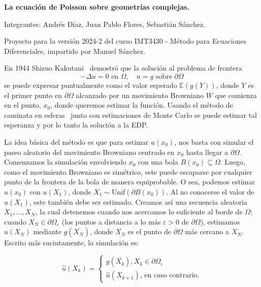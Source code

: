 \documentclass{article}
\begin{document}
\begin{center}
{\bfseries\Large
  La ecuación de Poisson sobre geometrías complejas.
}

\vspace{0.25cm}

Integrantes: Andrés Díaz, Juan Pablo Flores, Sebastián Sánchez.

\vspace{0.5cm}

{\scriptsize
Proyecto para la versión 2024-2 del curso 
IMT3430 - Método para Ecuaciones Diferenciales, impartido por Manuel Sánchez.
}
\end{center}

En 1944 Shizuo Kakutani~\cite{kak44} demostró que la solución al problema de frontera
\begin{displaymath}
  -\Delta u = 0 \text{ en } \Omega, \quad
  u = g \text{ sobre } \partial\Omega
\end{displaymath}
se puede expresar puntualmente como el valor esperado \(\mathbb{E}(g(Y))\), donde $Y$ es el primer punto en $\partial \Omega$ alcanzado por un movimiento Browniano $W$ que comienza en el punto, $x_0$, donde queremos estimar la función.
Usando el método de caminata en esferas~\cite{sawhney2020} junto con estimaciones de 
Monte Carlo se puede estimar tal esperanza y por lo tanto la solución a la EDP.

La idea básica del método es que para estimar $u(x_0)$, nos basta con simular el paseo aleatorio del movimiento Browniano centrado en $x_0$ hasta llegar a $\partial \Omega$. Comenzamos la simulación envolviendo $x_0$ con una bola $B(x_0)\subseteq\Omega$. Luego, como el movimiento Browniano es simétrico, este puede escaparse por cualquier punto de la frontera de la bola de manera equiprobable. O sea, podemos estimar $u(x_0)$ con $u(X_1)$, donde $X_1\sim \mbox{Unif}(\partial B(x_0))$. Al no conocerse el valor de $u(X_1)$, este también debe ser estimado. Creamos así una secuencia aleatoria $X_1,\ldots,X_{N}$, la cual detenemos cuando nos acercamos lo suficiente al borde de $\Omega$; cuando $X_{N}\in \partial \Omega_\varepsilon$ (los puntos a distancia a lo más $\varepsilon >0$ de $\partial \Omega$), estimamos $u(X_N)$ mediante $g(\overline{X_N})$, donde $\overline{X_N}$ es el punto de $\partial \Omega$ más cercano a $X_N$. Escrito más sucintamente, la simulación es:

\begin{equation*}
    \hat{u}(X_k)=\begin{cases}
        g(\overline{X_k}), X_k\in\partial\Omega_{\varepsilon}\\
        \hat{u}(X_{k+1}),\,\text{en caso contrario.}
    \end{cases}
\end{equation*}
\end{document}
